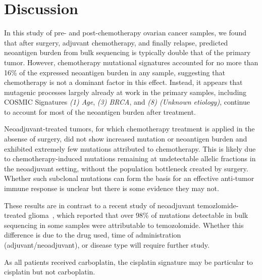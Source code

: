 \section*{Discussion}

In this study of pre- and post-chemotherapy ovarian cancer samples, we found that after surgery, adjuvant chemotherapy, and finally relapse, predicted neoantigen burden from bulk sequencing is typically double that of the primary tumor. However, chemotherapy mutational signatures accounted for no more than 16\% of the expressed neoantigen burden in any sample, suggesting that chemotherapy is not a dominant factor in this effect. Instead, it appears that mutagenic processes largely already at work in the primary samples, including COSMIC Signatures \textit{(1) Age}, \textit{(3) BRCA}, and \textit{(8) (Unknown etiology)}, continue to account for most of the neoantigen burden after treatment. 

Neoadjuvant-treated tumors, for which chemotherapy treatment is applied in the absense of surgery, did not show increased mutation or neoantigen burden and exhibited extremely few mutations attributed to chemotherapy. This is likely due to chemotherapy-induced mutations remaining at undetectable allelic fractions in the neoadjuvant setting, without the population bottleneck created by surgery. Whether such subclonal mutations can form the basis for an effective anti-tumor immune response is unclear but there is some evidence they may not\cite{McGranahan_2016}.



These results are in contrast to a recent study of neoadjuvant temozlomide-treated glioma~\cite{Johnson_2013}, which reported that over 98\% of mutations detectable in bulk sequencing in some samples were attributable to temozolomide. Whether this difference is due to the drug used, time of administration (adjuvant/neoadjuvant), or disease type will require further study.

As all patients received carboplatin, the cisplatin signature may be particular to cisplatin but not carboplatin.

